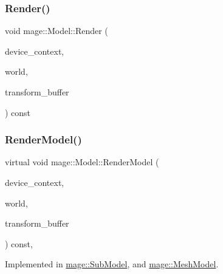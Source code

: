 \hypertarget{classmage_1_1_model_ac6dd064ce66a1fe234bc41ac4ebc1ae2}{}\label{classmage_1_1_model_ac6dd064ce66a1fe234bc41ac4ebc1ae2} 
\subsubsection{\texorpdfstring{Render()}{Render()}}
{\footnotesize\ttfamily void mage\+::\+Model\+::\+Render (\begin{DoxyParamCaption}\item[{\hyperlink{namespacemage_ae74f374780900893caa5555d1031fd79}{Com\+Ptr}$<$ I\+D3\+D11\+Device\+Context2 $>$}]{device\+\_\+context,  }\item[{const \hyperlink{classmage_1_1_world}{World} \&}]{world,  }\item[{const \hyperlink{structmage_1_1_transform_buffer}{Transform\+Buffer} \&}]{transform\+\_\+buffer }\end{DoxyParamCaption}) const}

\hypertarget{classmage_1_1_model_a7879cd7c98cefbaf325ee71832275265}{}\label{classmage_1_1_model_a7879cd7c98cefbaf325ee71832275265} 
\subsubsection{\texorpdfstring{Render\+Model()}{RenderModel()}}
{\footnotesize\ttfamily virtual void mage\+::\+Model\+::\+Render\+Model (\begin{DoxyParamCaption}\item[{\hyperlink{namespacemage_ae74f374780900893caa5555d1031fd79}{Com\+Ptr}$<$ I\+D3\+D11\+Device\+Context2 $>$}]{device\+\_\+context,  }\item[{const \hyperlink{classmage_1_1_world}{World} \&}]{world,  }\item[{const \hyperlink{structmage_1_1_transform_buffer}{Transform\+Buffer} \&}]{transform\+\_\+buffer }\end{DoxyParamCaption}) const\hspace{0.3cm}{\ttfamily [protected]}, {}}



Implemented in \hyperlink{classmage_1_1_sub_model_a8f5b7ce6498df58d44dd41cc3c42267b}{mage\+::\+Sub\+Model}, and \hyperlink{classmage_1_1_mesh_model_a92e9f0089386608f1912d459745d470f}{mage\+::\+Mesh\+Model}.

